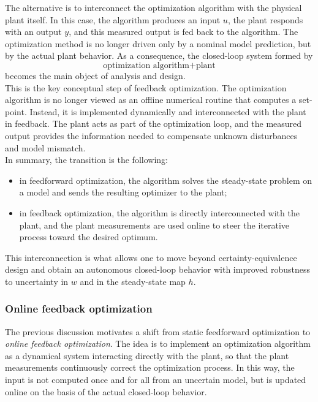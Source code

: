 The alternative is to interconnect the optimization algorithm with the physical plant itself. In this case, the algorithm produces an input $u$, the plant responds with an output $y$, and this measured output is fed back to the algorithm. The optimization method is no longer driven only by a nominal model prediction, but by the actual plant behavior. As a consequence, the closed-loop system formed by
\[
\text{optimization algorithm} + \text{plant}
\]
becomes the main object of analysis and design.\\

This is the key conceptual step of feedback optimization. The optimization algorithm is no longer viewed as an offline numerical routine that computes a set-point. Instead, it is implemented dynamically and interconnected with the plant in feedback. The plant acts as part of the optimization loop, and the measured output provides the information needed to compensate unknown disturbances and model mismatch.\\

In summary, the transition is the following:
\begin{itemize}
    \item in feedforward optimization, the algorithm solves the steady-state problem on a model and sends the resulting optimizer to the plant;
    \item in feedback optimization, the algorithm is directly interconnected with the plant, and the plant measurements are used online to steer the iterative process toward the desired optimum.
\end{itemize}

This interconnection is what allows one to move beyond certainty-equivalence design and obtain an autonomous closed-loop behavior with improved robustness to uncertainty in $w$ and in the steady-state map $h$.\\

\subsubsection{Online feedback optimization}

The previous discussion motivates a shift from static feedforward optimization to \emph{online feedback optimization}. The idea is to implement an optimization algorithm as a dynamical system interacting directly with the plant, so that the plant measurements continuously correct the optimization process. In this way, the input is not computed once and for all from an uncertain model, but is updated online on the basis of the actual closed-loop behavior.\\

